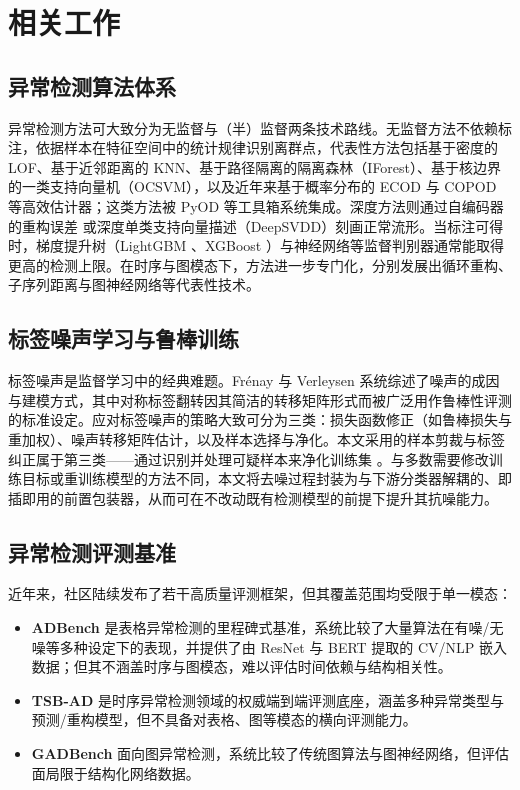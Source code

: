 \chapter{相关工作}\label{chap:related}

\section{异常检测算法体系}
异常检测方法可大致分为无监督与（半）监督两条技术路线。无监督方法不依赖标注，依据样本在特征空间中的统计规律识别离群点，代表性方法包括基于密度的 LOF、基于近邻距离的 KNN、基于路径隔离的隔离森林（IForest）、基于核边界的一类支持向量机（OCSVM）\cite{scholkopf1999support}，以及近年来基于概率分布的 ECOD 与 COPOD 等高效估计器；这类方法被 PyOD \cite{zhao2019pyod} 等工具箱系统集成。深度方法则通过自编码器的重构误差 \cite{an2015variational} 或深度单类支持向量描述（DeepSVDD）刻画正常流形。当标注可得时，梯度提升树（LightGBM \cite{ke2017lightgbm}、XGBoost \cite{chen2016xgboost}）与神经网络等监督判别器通常能取得更高的检测上限。在时序与图模态下，方法进一步专门化，分别发展出循环重构、子序列距离与图神经网络等代表性技术。

\section{标签噪声学习与鲁棒训练}
标签噪声是监督学习中的经典难题。Frénay 与 Verleysen \cite{frenay2013labelnoise} 系统综述了噪声的成因与建模方式，其中对称标签翻转因其简洁的转移矩阵形式而被广泛用作鲁棒性评测的标准设定。应对标签噪声的策略大致可分为三类：损失函数修正（如鲁棒损失与重加权）、噪声转移矩阵估计，以及样本选择与净化。本文采用的样本剪裁与标签纠正属于第三类——通过识别并处理可疑样本来净化训练集 \cite{jiang2020trim}。与多数需要修改训练目标或重训练模型的方法不同，本文将去噪过程封装为与下游分类器解耦的、即插即用的前置包装器，从而可在不改动既有检测模型的前提下提升其抗噪能力。

\section{异常检测评测基准}
近年来，社区陆续发布了若干高质量评测框架，但其覆盖范围均受限于单一模态：
\begin{itemize}
    \item \textbf{ADBench} \cite{han2022adbench} 是表格异常检测的里程碑式基准，系统比较了大量算法在有噪/无噪等多种设定下的表现，并提供了由 ResNet 与 BERT 提取的 CV/NLP 嵌入数据；但其不涵盖时序与图模态，难以评估时间依赖与结构相关性。
    \item \textbf{TSB-AD} \cite{paparrizos2024tsbad} 是时序异常检测领域的权威端到端评测底座，涵盖多种异常类型与预测/重构模型，但不具备对表格、图等模态的横向评测能力。
    \item \textbf{GADBench} \cite{gadbench2024} 面向图异常检测，系统比较了传统图算法与图神经网络，但评估面局限于结构化网络数据。
\end{itemize}

